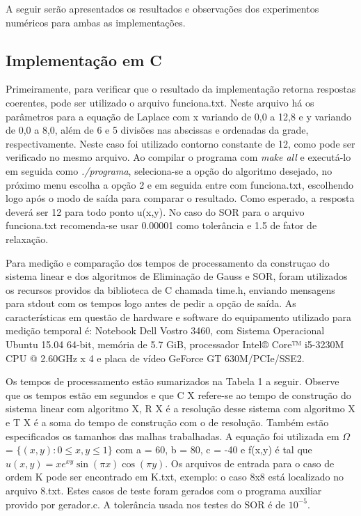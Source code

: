 \documentclass[
	article,			%
	11pt,				%
	oneside,			%
	a4paper,			%
	english,			%
	brazil,				%
	sumario=tradicional
	]{abntex2}
\begin{document}
A seguir serão apresentados os resultados e observações dos experimentos numéricos para ambas as implementações.

\subsection{Implementação em C}

Primeiramente, para verificar que o resultado da implementação retorna respostas coerentes, pode ser utilizado o arquivo funciona.txt. Neste arquivo há os parâmetros para a equação de Laplace com x variando de 0,0 a 12,8 e y variando de 0,0 a 8,0, além de 6 e 5 divisões nas abscissas e ordenadas da grade, respectivamente. Neste caso foi utilizado contorno constante de 12, como pode ser verificado no mesmo arquivo. Ao compilar o programa com \emph{make all} e executá-lo em seguida como \emph{./programa}, seleciona-se a opção do algoritmo desejado, no próximo menu escolha a opção 2 e em seguida entre com funciona.txt, escolhendo logo após o modo de saída para comparar o resultado. Como esperado, a resposta deverá ser 12 para todo ponto u(x,y). No caso do SOR para o arquivo funciona.txt recomenda-se usar 0.00001 como tolerância e 1.5 de fator de relaxação.

Para medição e comparação dos tempos de processamento da construçao do sistema linear e dos algoritmos de Eliminação de Gauss e SOR, foram utilizados os recursos providos da biblioteca de C chamada time.h, enviando mensagens para stdout com os tempos logo antes de pedir a opção de saída. As características em questão de hardware e software do equipamento utilizado para medição temporal é: Notebook Dell Vostro 3460, com Sistema Operacional Ubuntu 15.04 64-bit, memória de 5.7 GiB, processador Intel® Core™ i5-3230M CPU @ 2.60GHz x 4 e placa de vídeo GeForce GT 630M/PCIe/SSE2. 

Os tempos de processamento estão sumarizados na Tabela 1 a seguir. Observe que os tempos estão em segundos e que C X refere-se ao tempo de construção do sistema linear com algoritmo X, R X é a resolução desse sistema com algoritmo X e T X é a soma do tempo de construção com o de resolução. Também estão especificados os tamanhos das malhas trabalhadas. A equação foi utilizada em $\Omega$ = $\{(x,y) : 0 \leq x,y \leq 1\}$ com a = 60, b = 80, c = -40 e f(x,y) é tal que $u(x,y)=x e^{xy} \sin (\pi x) \cos (\pi y)$. Os arquivos de entrada para o caso de ordem K pode ser encontrado em K.txt, exemplo: o caso 8x8 está localizado no arquivo 8.txt. Estes casos de teste foram gerados com o programa auxiliar provido por gerador.c. A tolerância usada nos testes do SOR é de $10^{-5}$.
\end{document}
